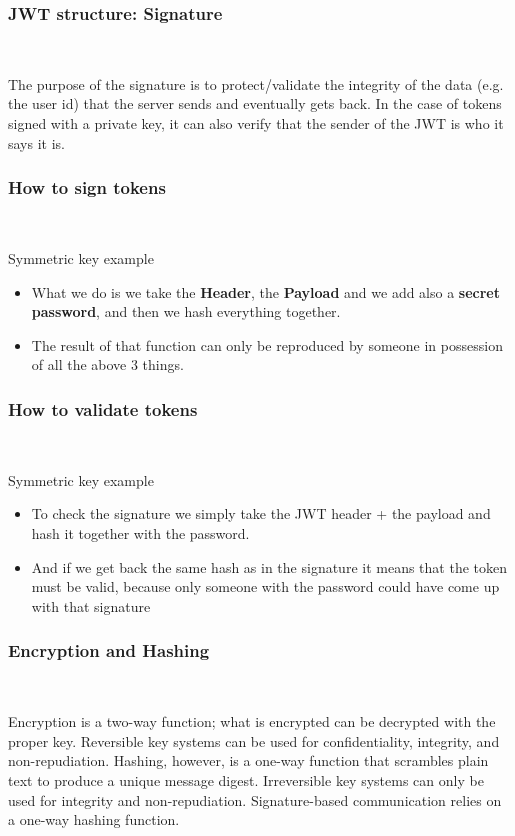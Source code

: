 \documentclass{beamer}
\begin{document}
\begin{frame}
	\frametitle{JWT structure: Signature}\ \newline
	
	The purpose of the signature is to protect/validate the integrity of the data (e.g. the user id) that the server sends and eventually gets back.\newline
	In the case of tokens signed with a private key, it can also verify that the sender of the JWT is who it says it is.
	
\end{frame}

\begin{frame}
	\frametitle{How to sign tokens}\ \newline
	
	Symmetric key example
	\begin{itemize}	
		\item What we do is we take the  \textbf{Header}, the \textbf{Payload} and we add also a \textbf{secret password}, and then we hash everything together.
		\item The result of that function can only be reproduced by someone in possession of all the above 3 things.
	\end{itemize}
\end{frame}

\begin{frame}
	\frametitle{How to validate tokens}\ \newline
	
	Symmetric key example
	\begin{itemize}	
		\item To check the signature we simply take the JWT header + the payload and hash it together with the password.
		\item And if we get back the same hash as in the signature it means that the token must be valid, because only someone with the password could have come up with that signature
		\end{itemize}
\end{frame}

\begin{frame}
	\frametitle{Encryption and Hashing}\ \newline
	
	Encryption is a two-way function; what is encrypted can be decrypted with the proper key. Reversible key systems can be used for confidentiality, integrity, and non-repudiation. \newline \newline
	Hashing, however, is a one-way function that scrambles plain text to produce a unique message digest. Irreversible key systems can only be used for integrity and non-repudiation.  \newline \newline
	Signature-based communication relies on a one-way hashing function.
\end{frame}
\end{document}
